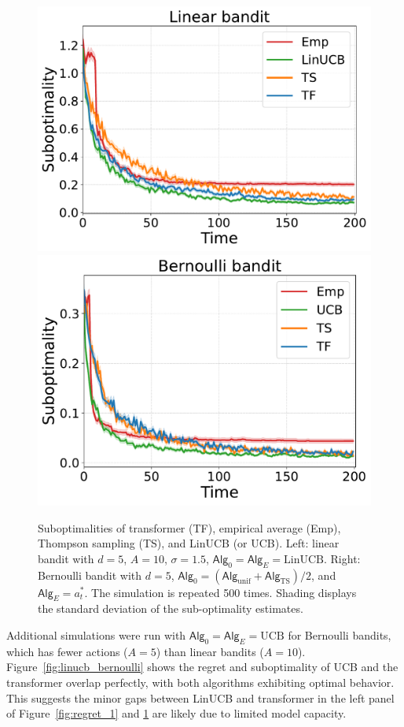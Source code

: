 \documentclass[10pt]{article}
\newcommand{\<}{\left\langle}
\renewcommand{\>}{\right\rangle}
\newcommand{\LinUCB}{{\mathrm{LinUCB}}}
\newcommand{\UCB}{{\mathrm{UCB}}}
\newcommand{\TS}{{\mathrm{TS}}}
\newcommand{\action}{{a}}
\newcommand{\sAlg}{{\mathsf{Alg}}}
\newcommand{\shortexp}{{E}}
\newcommand{\Numact}{{A}}
\begin{document}
\begin{figure}[ht]
\centering
\includegraphics[width=0.46\linewidth]{Sections/figs/record_2_cum_False.pdf}
\includegraphics[width=0.45\linewidth]{Sections/figs/record_1_cum_False.pdf}
\caption{Suboptimalities of transformer (TF), empirical average (Emp), Thompson sampling (TS), and LinUCB (or UCB). Left: linear bandit with $d=5$, $A=10$, $\sigma=1.5$, $\sAlg_0=\sAlg_\shortexp=\LinUCB$. Right: Bernoulli bandit with $d=5$, $\sAlg_0=(\sAlg_{\mathrm{unif}}+\sAlg_{\TS})/2$, and $\sAlg_\shortexp=\action_t^*$. The simulation is repeated 500 times. Shading displays the standard deviation of the sub-optimality estimates.
}
\label{fig:subopt_1}
\end{figure}


Additional simulations were run with $\sAlg_0=\sAlg_{\shortexp}=\UCB$ for Bernoulli bandits, which has fewer actions ($\Numact=5$) than linear bandits ($\Numact=10$). Figure~\ref{fig:linucb_bernoulli} shows the regret and suboptimality of UCB and the transformer overlap perfectly, with both algorithms exhibiting optimal behavior. This suggests the minor gaps between LinUCB and transformer in the left panel of Figure~\ref{fig:regret_1} and \ref{fig:subopt_1} are likely due to limited model capacity.
\end{document}
